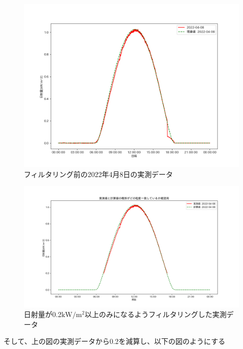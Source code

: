 \documentclass[a4j,12pt,]{jarticle}
\begin{document}
\begin{figure}[H]
  \begin{center}
    \includegraphics[width=160mm]{8.png}
    \caption{フィルタリング前の2022年4月8日の実測データ}
    \label{p8}
  \end{center}
\end{figure}

\begin{figure}[H]
  \begin{center}
    \includegraphics[width=160mm]{9.png}
    \caption{日射量が0.2$\mathrm{kW}/\mathrm{m}^2$以上のみになるようフィルタリングした実測データ}
    \label{p9}
  \end{center}
\end{figure}

そして、上の図の実測データから0.2を減算し、以下の図のようにする
\end{document}
